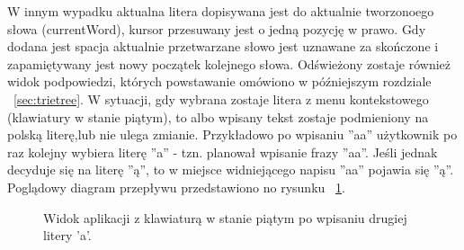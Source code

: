 \documentclass[twoside,a4paper]{book}
\begin{document}
W innym wypadku aktualna litera dopisywana jest do aktualnie tworzonoego słowa (currentWord), kursor przesuwany jest o jedną pozycję w prawo. Gdy dodana jest spacja aktualnie przetwarzane słowo jest uznawane za skończone i zapamiętywany jest nowy początek kolejnego słowa. Odświeżony zostaje również widok podpowiedzi, których powstawanie omówiono w późniejszym rozdziale ~\ref{sec:trietree}.
W sytuacji, gdy wybrana zostaje litera z menu kontekstowego (klawiatury w stanie piątym), to albo wpisany tekst zostaje podmieniony na polską literę,lub nie ulega zmianie. Przykładowo po wpisaniu ''aa'' użytkownik po raz kolejny wybiera literę ''a'' - tzn. planował wpisanie frazy ''aa''. Jeśli jednak decyduje się na literę ''ą'', to w miejsce widniejącego napisu ''aa'' pojawia się ''ą''.
Poglądowy diagram przepływu przedstawiono no rysunku ~\ref{fig:wordFlow}.
\begin{figure}[!h]
		\centering
		\caption{Widok aplikacji z klawiaturą w stanie piątym po wpisaniu drugiej litery 'a'.}
		\label{fig:wordFlow}
\end{figure}
\end{document}
